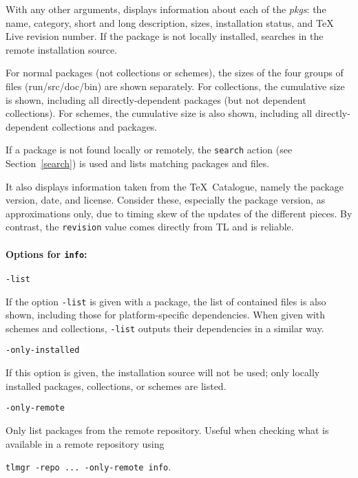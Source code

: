\documentclass[11pt]{article}
\begin{document}
With any other arguments, displays information about each
of the \textsl{pkgs}: the name, category, short and long
description, sizes, installation status, and \TeX\,Live
revision number. If the package is not locally installed,
searches in the remote installation source.

For normal packages (not collections or schemes), the sizes
of the four groups of files (run/src/doc/bin) are shown
separately. For collections, the cumulative size is shown,
including all directly-dependent packages (but not dependent
collections). For schemes, the cumulative size is also
shown, including all directly-dependent collections and
packages.

If a package is not found locally or remotely, the
\texttt{search} action (see Section~\ref{search}) is used
and lists matching packages and files.

It also displays information taken from the \TeX\ Catalogue,
namely the package version, date, and license. Consider
these, especially the package version, as approximations
only, due to timing skew of the updates of the different
pieces. By contrast, the \texttt{revision} value comes
directly from TL and is reliable.


\paragraph{Options for \mdseries\texttt{info}:}

\begin{description}

\item\texttt{-list}\par 

If the option \texttt{-list} is given with a package, the
list of contained files is also shown, including those for
platform-specific dependencies. When given with schemes and
collections, \texttt{-list} outputs their dependencies in a
similar way.

\item\texttt{-only-installed}\par 

If this option is given, the installation source will not
be used; only locally installed packages, collections, or
schemes are listed.

\item\texttt{-only-remote}\par 

Only list packages from the remote repository. Useful when
checking what is available in a remote repository using
\begin{center}
\texttt{tlmgr -repo ... -only-remote info}. 
\end{center}

\end{description}
\end{document}
